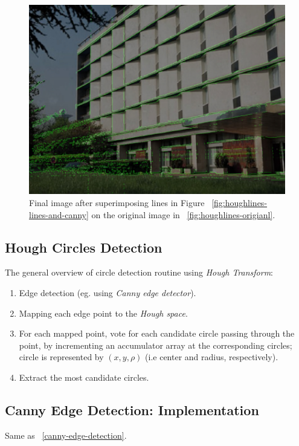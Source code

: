 \documentclass[letterpaper, 12 pt, conference ,onecolumn]{ieeeconf}  %
\begin{document}
\begin{figure}[h!]                                          
\includegraphics[width=0.4\paperwidth]{hough-lines/final-image.jpg}
\caption{Final image after superimposing lines in Figure ~\ref{fig:houghlines-lines-and-canny} on the original image in ~\ref{fig:houghlines-origianl}. }
\label{fig:houghlines-final}
\end{figure}

\subsection{ Hough Circles Detection }
                   
The general overview of circle detection routine using \textit{Hough Transform}:
\begin{enumerate}

\item Edge detection (eg. using \textit{Canny edge detector}).
\item Mapping each edge point to the \textit{Hough space}.
\item For each mapped point, vote for each candidate circle passing through the point, by incrementing an accumulator array at the corresponding circles; circle is represented by $(x, y, \rho)$ (i.e center and radius, respectively).
\item Extract the most candidate circles.                            
\end{enumerate} 


\subsection*{Canny Edge Detection: Implementation} 
Same as ~\ref{canny-edge-detection}.
\end{document}
